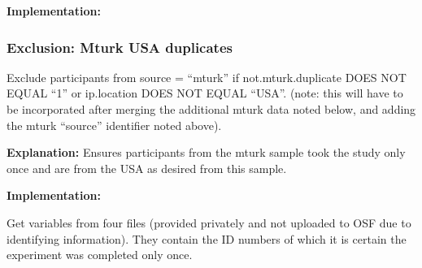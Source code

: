 \documentclass[]{article}
\newenvironment{Shaded}{\begin{snugshade}}{\end{snugshade}}
\newcommand{\KeywordTok}[1]{\textcolor[rgb]{0.94,0.87,0.69}{{#1}}}
\newcommand{\DataTypeTok}[1]{\textcolor[rgb]{0.87,0.87,0.75}{{#1}}}
\newcommand{\DecValTok}[1]{\textcolor[rgb]{0.86,0.86,0.80}{{#1}}}
\newcommand{\StringTok}[1]{\textcolor[rgb]{0.80,0.58,0.58}{{#1}}}
\newcommand{\OtherTok}[1]{\textcolor[rgb]{0.94,0.94,0.56}{{#1}}}
\newcommand{\NormalTok}[1]{\textcolor[rgb]{0.80,0.80,0.80}{{#1}}}
\begin{document}
\textbf{Implementation:}

\begin{Shaded}
\end{Shaded}

\subsubsection{\textbf{Exclusion:} Mturk USA
duplicates}\label{exclusion-mturk-usa-duplicates}

Exclude participants from source = ``mturk'' if not.mturk.duplicate DOES
NOT EQUAL ``1'' or ip.location DOES NOT EQUAL ``USA''. (note: this will
have to be incorporated after merging the additional mturk data noted
below, and adding the mturk ``source'' identifier noted above).

\textbf{Explanation:} Ensures participants from the mturk sample took
the study only once and are from the USA as desired from this sample.

\textbf{Implementation:}

Get variables from four files (provided privately and not uploaded to
OSF due to identifying information). They contain the ID numbers of
which it is certain the experiment was completed only once.
\end{document}
